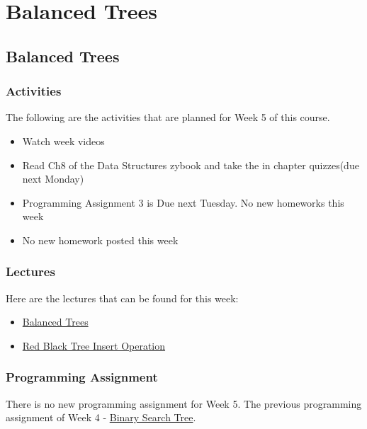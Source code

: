 \clearpage

\renewcommand{\ChapTitle}{Balanced Trees}

\chapter{\ChapTitle}
\section{\ChapTitle}

\subsection{Activities}

The following are the activities that are planned for Week 5 of this course.

\begin{itemize}
    \item Watch week videos
    \item Read Ch8 of the Data Structures zybook and take the in chapter quizzes(due next Monday)
    \item Programming Assignment 3 is Due next Tuesday. No new homeworks this week
    \item No new homework posted this week
\end{itemize}

\subsection{Lectures}

Here are the lectures that can be found for this week:

\begin{itemize}
    \item \href{https://applied.cs.colorado.edu/mod/hvp/view.php?id=45925}{Balanced Trees}
    \item \href{https://applied.cs.colorado.edu/mod/hvp/view.php?id=45926}{Red Black Tree Insert Operation}
\end{itemize}

\subsection{Programming Assignment}

There is no new programming assignment for Week 5. The previous programming assignment of Week 4 - \href{https://github.com/QuantumCompiler/CU/tree/main/CSPB%202270%20-%20Data%20Structures/CSPB%202270%20-%20Programming%20Assignments/CSPB%202270%20-%20Assignment%203%20-%20Binary%20Search%20Tree}{Binary Search Tree}.

